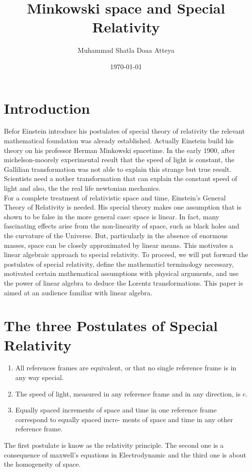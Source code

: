 \documentclass[11]{article}
\begin{document}
\title{Minkowski space and Special Relativity}
\author{Muhammad Shatla \hspace {10mm} Doaa Atteya}
\date{\today}
\maketitle
\newpage
\tableofcontents
\newpage

\section{Introduction}
Befor Einstein introduce his postulates of special theory of relativity  the relevant mathematical foundation was already established. Actually Einstein build his theory on his professor Herman Minkowski spacetime.
In the early 1900, after michelson-moorely experimental result that the speed of light is constant, the Gallilian transformation was not able to explain this strange but true result. Scientists need a nother transformation that can explain the constant speed of light and also, the the real life newtonian mechanics. \\
For a complete treatment of relativistic space and time, Einstein's General Theory of Relativity is needed.
His special theory makes one assumption that is shown to be false in the more general case: space is linear.
In fact, many fascinating effects arise from the non-linearity of space, such as black holes and the curvature
of the Universe. But, particularly in the absence of enormous masses, space can be closely approximated
by linear means. This motivates a linear algebraic approach to special relativity. To proceed, we will put
forward the postulates of special relativity, define the mathematicl terminology necessary, motivated certain
mathematical assumptions with physical arguments, and use the power of linear algebra to deduce the Lorentz
transformations. This paper is aimed at an audience familiar with linear algebra.

\section{The three Postulates of Special Relativity}
\begin{enumerate}
\item All references frames are equivalent, or that no single reference frame is in any way special.
\item The speed of light, measured in any reference frame and in any direction, is c.
\item Equally spaced increments of space and time in one reference frame correspond to equally spaced incre-
ments of space and time in any other reference frame.
\end{enumerate}
The first postulate is know as the relativity principle. The second one is a consequence of maxwell’s equations in Electrodynamic and the third one is about the homogeneity of space.
\end{document}
